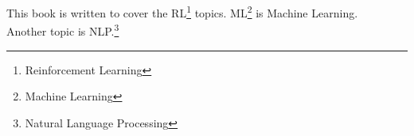 \documentclass[12pt]{article}
\begin{document}
	
	\noindent
	This book is written to cover the RL\footnote{Reinforcement Learning} topics. ML\footnote{Machine Learning} is Machine Learning.\\[12pt]
	\noindent %
	Another topic is NLP.\footnote{Natural Language Processing}\\
	
\end{document}

